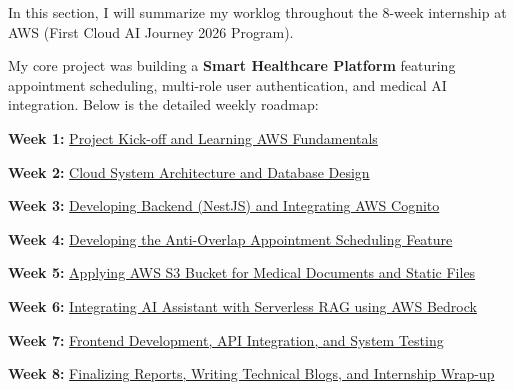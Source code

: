 In this section, I will summarize my worklog throughout the 8-week
internship at AWS (First Cloud AI Journey 2026 Program).

My core project was building a \textbf{Smart Healthcare Platform}
featuring appointment scheduling, multi-role user authentication, and
medical AI integration. Below is the detailed weekly roadmap:

\textbf{Week 1:} \href{1.1-week1/}{Project Kick-off and Learning AWS
Fundamentals}

\textbf{Week 2:} \href{1.2-week2/}{Cloud System Architecture and
Database Design}

\textbf{Week 3:} \href{1.3-week3/}{Developing Backend (NestJS) and
Integrating AWS Cognito}

\textbf{Week 4:} \href{1.4-week4/}{Developing the Anti-Overlap
Appointment Scheduling Feature}

\textbf{Week 5:} \href{1.5-week5/}{Applying AWS S3 Bucket for Medical
Documents and Static Files}

\textbf{Week 6:} \href{1.6-week6/}{Integrating AI Assistant with
Serverless RAG using AWS Bedrock}

\textbf{Week 7:} \href{1.7-week7/}{Frontend Development, API
Integration, and System Testing}

\textbf{Week 8:} \href{1.8-week8/}{Finalizing Reports, Writing Technical
Blogs, and Internship Wrap-up}

